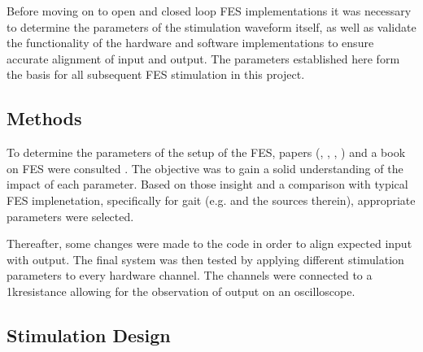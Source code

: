 
Before moving on to open and closed loop FES implementations it was necessary to determine the parameters of the stimulation waveform itself, as well as validate the functionality of the hardware and software implementations to ensure accurate alignment of input and output. The parameters established here form the basis for all subsequent FES stimulation in this project.

\subsection{Methods}
To determine the parameters of the setup of the FES, papers (\cite{peckham_functional_2005}, \cite{lynch_functional_2008}, \cite{marquez-chin_functional_2020}, \cite{bigland-ritchie_muscle_2000}) and a book \cite{wood_chapter_2020} on FES were consulted  . The objective was to gain a solid understanding of the impact of each parameter. Based on those insight and a comparison with typical FES implenetation, specifically for gait (e.g. \cite{aout_effects_2023} and the sources therein), appropriate parameters were selected. 

Thereafter, some changes were made to the code in order to align expected input with output. The final system was then tested by applying different stimulation parameters to every hardware channel. The channels were connected to a 1k\ohm resistance allowing for the observation of output on an oscilloscope. 

\subsection{Stimulation Design}
